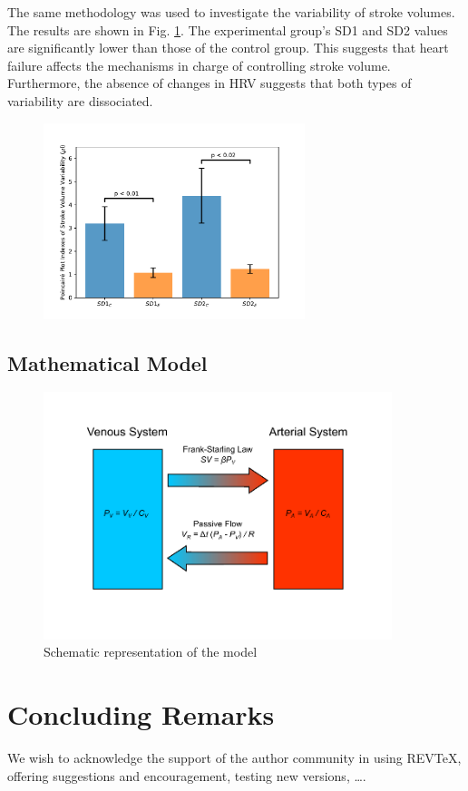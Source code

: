 \documentclass[%
preprint,
 amsmath,amssymb,
 aps,
]{revtex4-2}
\begin{document}
The same methodology was used to investigate the variability of stroke volumes. The results are shown in Fig. \ref{fig:fig04}. The experimental group's SD1 and SD2 values are significantly lower than those of the control group. This suggests that heart failure affects the mechanisms in charge of controlling stroke volume. Furthermore, the absence of changes in HRV suggests that both types of variability are dissociated.
\begin{figure}[h!]
    \includegraphics[width=3in]{Fig04.pdf}
    \caption{}
    \label{fig:fig04}
\end{figure}

\subsection{Mathematical Model}

\begin{figure}
\includegraphics[width=4in]{model.pdf}
\caption{Schematic representation of the model}
\label{fig:model}
\end{figure}

\section{Concluding Remarks}

\begin{acknowledgments}
We wish to acknowledge the support of the author community in using
REV\TeX{}, offering suggestions and encouragement, testing new versions,
\dots.
\end{acknowledgments}



\end{document}
